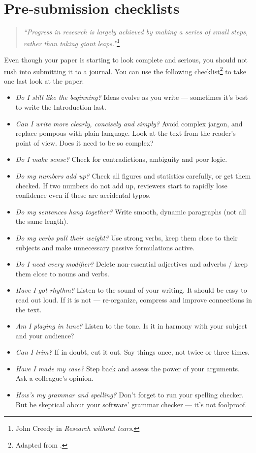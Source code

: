 \documentclass[graybox,envcountchap,sectrefs,UStrade]{svmono}
\begin{document}
\newpage

\section{Pre-submission checklists}


\begin{quote}
\emph{``Progress in research is largely achieved by making a series of small steps, rather than taking giant leaps.''}\footnote{John Creedy in \emph{Research without tears}.}
\end{quote}

Even though your paper is starting to look complete and serious, you should not rush into submitting it to a journal. You can use the following checklist\footnote{Adapted from \citet{oConnor1975writing}.} to take one last look at the paper:

\begin{itemize}
  \item \emph{Do I still like the beginning?} Ideas evolve as you write --- sometimes it's best to write the Introduction last.
  \item \emph{Can I write more clearly, concisely and simply?} Avoid complex jargon, and replace pompous with plain language. Look at the text from the reader's point of view. Does it need to be so complex?
  \item \emph{Do I make sense?} Check for contradictions, ambiguity and poor logic.
  \item \emph{Do my numbers add up?} Check all figures and statistics carefully, or get them checked. If two numbers do not add up, reviewers start to rapidly lose confidence even if these are accidental typos.
  \item \emph{Do my sentences \emph{hang} together?} Write smooth, dynamic paragraphs (not all the same length).
  \item \emph{Do my verbs pull their weight?} Use strong verbs, keep them close to their subjects and make unnecessary passive formulations active.
  \item \emph{Do I need every modifier?} Delete non-essential adjectives and adverbs / keep them close to nouns and verbs.
  \item \emph{Have I got rhythm?} Listen to the sound of your writing. It should be easy to read out loud. If it is not --- re-organize, compress and improve connections in the text.
  \item \emph{Am I playing in tune?} Listen to the tone. Is it in harmony with your subject and your audience?
  \item \emph{Can I trim?} If in doubt, cut it out. Say things once, not twice or three times.
  \item \emph{Have I made my case?} Step back and assess the power of your arguments. Ask a colleague's opinion.
  \item \emph{How's my grammar and spelling?} Don't forget to run your spelling checker. But be skeptical about your software' grammar checker --- it's not foolproof.
\end{itemize}
\end{document}
